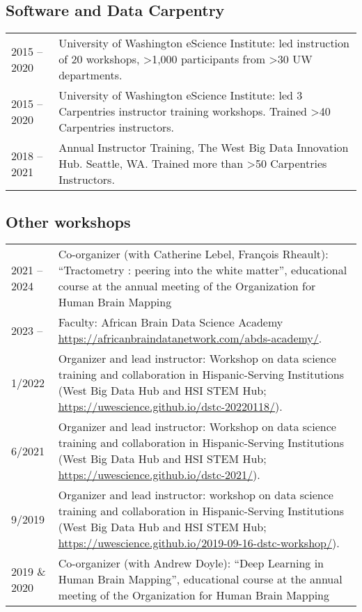 \documentclass[11pt,fullpage]{article}
\begin{document}
\subsection*{Software and Data Carpentry}
\begin{tabular}{p{}p{}}
 2015 -- 2020 & University of Washington eScience Institute: led instruction of 20 workshops, >1,000 participants from >30 UW departments. \\
 2015 -- 2020 & University of Washington eScience Institute: led 3 Carpentries instructor training workshops. Trained >40 Carpentries instructors.\\
 2018 -- 2021 & Annual Instructor Training, The West Big Data Innovation Hub. Seattle, WA. Trained more than >50 Carpentries Instructors.
\end{tabular}

\subsection*{Other workshops}
\begin{tabular}{p{}p{}}
2021 -- 2024 & Co-organizer (with Catherine Lebel, Fran\c{c}ois Rheault): ``Tractometry : peering into the white matter'', educational course at the annual meeting of the Organization for Human Brain Mapping \\
2023 -- & Faculty: African Brain Data Science Academy \url{https://africanbraindatanetwork.com/abds-academy/}.\\
1/2022 & Organizer and lead instructor: Workshop on data science training and collaboration in Hispanic-Serving Institutions (West Big Data Hub and HSI STEM Hub; \url{https://uwescience.github.io/dstc-20220118/}).\\
6/2021 & Organizer and lead instructor: Workshop on data science training and collaboration in Hispanic-Serving Institutions (West Big Data Hub and HSI STEM Hub; \url{https://uwescience.github.io/dstc-2021/}).\\
9/2019 & Organizer and lead instructor: workshop on data science training and collaboration in Hispanic-Serving Institutions (West Big Data Hub and HSI STEM Hub; \url{https://uwescience.github.io/2019-09-16-dstc-workshop/}).\\
2019 \& 2020 & Co-organizer (with Andrew Doyle): ``Deep Learning in Human Brain Mapping'', educational course at the annual meeting of the Organization for Human Brain Mapping\\

\end{tabular}
\end{document}
